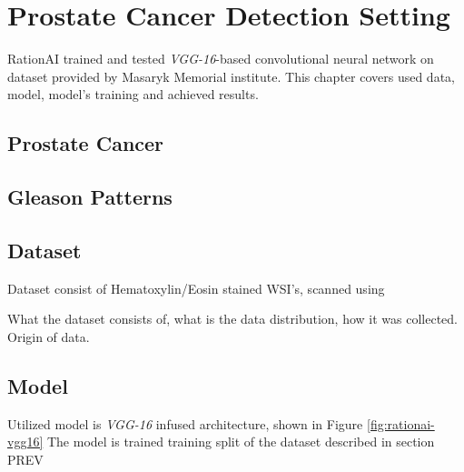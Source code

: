\chapter{Prostate Cancer Detection Setting}

RationAI trained and tested \emph{VGG-16}-based convolutional neural network on dataset provided by Masaryk Memorial institute. This chapter covers used data, model, model's training and achieved results.

\section{Prostate Cancer}

\section{Gleason Patterns}

\section{Dataset}

Dataset consist of Hematoxylin/Eosin stained WSI's, scanned using

What the dataset consists of, what is the data distribution, how it was collected. Origin of data.

\section{Model}

Utilized model is \emph{VGG-16} infused architecture, shown in Figure \ref{fig:rationai-vgg16} The model is trained training split of the dataset described in section PREV

